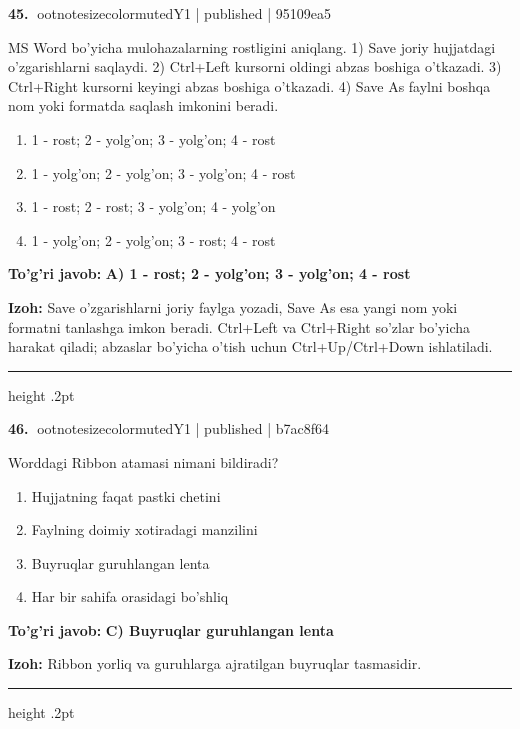 \documentclass[10pt,a4paper]{article}
\begin{document}
\textbf{\color{ink}45.} {ootnotesizecolor{muted}Y1 | published | 95109ea5}
\par
MS Word bo'yicha mulohazalarning rostligini aniqlang. 1) Save joriy hujjatdagi o'zgarishlarni saqlaydi. 2) Ctrl+Left kursorni oldingi abzas boshiga o'tkazadi. 3) Ctrl+Right kursorni keyingi abzas boshiga o'tkazadi. 4) Save As faylni boshqa nom yoki formatda saqlash imkonini beradi.
\begin{enumerate}[label=\Alph*),leftmargin=9mm]
\item 1 - rost; 2 - yolg'on; 3 - yolg'on; 4 - rost
\item 1 - yolg'on; 2 - yolg'on; 3 - yolg'on; 4 - rost
\item 1 - rost; 2 - rost; 3 - yolg'on; 4 - yolg'on
\item 1 - yolg'on; 2 - yolg'on; 3 - rost; 4 - rost
\end{enumerate}
\begin{tcolorbox}[enhanced,breakable,colback=teal!4,colframe=teal!55!black,boxrule=0.45pt,arc=1.2mm,left=2.8mm,right=2.8mm,top=2mm,bottom=2mm]
\textbf{\color{teal}To'g'ri javob:} \textbf{A) 1 - rost; 2 - yolg'on; 3 - yolg'on; 4 - rost}
\par\smallskip
\textbf{Izoh:} Save o'zgarishlarni joriy faylga yozadi, Save As esa yangi nom yoki formatni tanlashga imkon beradi. Ctrl+Left va Ctrl+Right so'zlar bo'yicha harakat qiladi; abzaslar bo'yicha o'tish uchun Ctrl+Up/Ctrl+Down ishlatiladi.
\end{tcolorbox}
\vspace{2mm}\hrule height .2pt\vspace{2mm}

\textbf{\color{ink}46.} {ootnotesizecolor{muted}Y1 | published | b7ac8f64}
\par
Worddagi Ribbon atamasi nimani bildiradi?
\begin{enumerate}[label=\Alph*),leftmargin=9mm]
\item Hujjatning faqat pastki chetini
\item Faylning doimiy xotiradagi manzilini
\item Buyruqlar guruhlangan lenta
\item Har bir sahifa orasidagi bo'shliq
\end{enumerate}
\begin{tcolorbox}[enhanced,breakable,colback=teal!4,colframe=teal!55!black,boxrule=0.45pt,arc=1.2mm,left=2.8mm,right=2.8mm,top=2mm,bottom=2mm]
\textbf{\color{teal}To'g'ri javob:} \textbf{C) Buyruqlar guruhlangan lenta}
\par\smallskip
\textbf{Izoh:} Ribbon yorliq va guruhlarga ajratilgan buyruqlar tasmasidir.
\end{tcolorbox}
\vspace{2mm}\hrule height .2pt\vspace{2mm}
\end{document}

